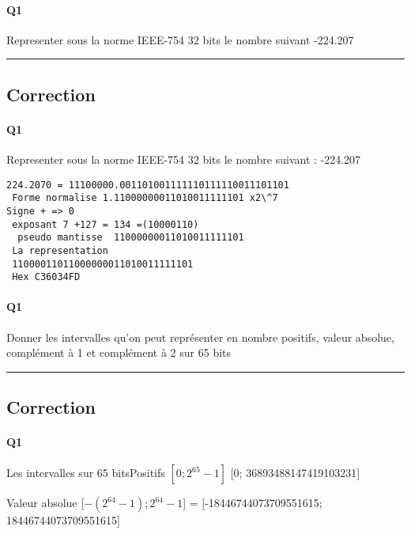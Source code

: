 \paragraph{Q1}

Representer sous la norme IEEE-754 32 bits le nombre suivant
-224.207

\hrule width 1\linewidth
\pagebreak

\subsection{Correction}


\paragraph{Q1}

Representer sous la norme IEEE-754 32 bits le nombre suivant : -224.207

\begin{verbatim}224.2070 = 11100000.001101001111110111110011101101
 Forme normalise 1.11000000011010011111101 x2\^7
Signe + => 0
 exposant 7 +127 = 134 =(10000110)
  pseudo mantisse  11000000011010011111101 
 La representation 
 11000011011000000011010011111101
 Hex C36034FD

\end{verbatim}
\pagebreak

\paragraph{Q1}

Donner les intervalles qu'on peut représenter en nombre positifs, valeur absolue, complément à 1 et complément à 2  sur 65 bits



\hrule width 1\linewidth
\pagebreak

\subsection{Correction}


\paragraph{Q1}

Les intervalles sur 65 bitsPositifs $[0; 2^{65}-1]$ [0; 36893488147419103231]

Valeur absolue [$-(2^{64}-1);2^{64}-1$] = [-18446744073709551615; 18446744073709551615]

